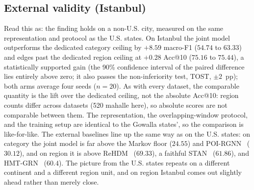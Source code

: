 \subsection{External validity (Istanbul)}
\label{sec:results-external}
Read this as: the finding holds on a non-U.S. city, measured on the same
representation and protocol as the U.S. states. On Istanbul the
joint model outperforms the dedicated category ceiling by $+8.59$ macro-F1
($54.74$ to $63.33$) and edges past the dedicated region ceiling at $+0.28$
Acc@10 ($75.16$ to $75.44$), a statistically supported gain (the 90\%
confidence interval of the paired difference lies entirely above zero; it also
passes the non-inferiority test, TOST, $\pm2$~pp); both arms average four seeds
($n{=}20$). As with every dataset, the comparable quantity is the lift over the dedicated
ceiling, not the absolute Acc@10: region counts differ across datasets (520
mahalle here), so absolute scores are not comparable between them. The representation, the overlapping-window protocol, and the training setup
are identical to the Gowalla states', so the comparison is like-for-like. The external baselines line up the same way as on
the U.S. states: on category the joint model is far above the Markov
floor ($24.55$) and POI-RGNN~\cite{capanema2023poirgnn} ($30.12$), and on
region it is above ReHDM~\cite{li2025rehdm} ($69.33$), a faithful
STAN~\cite{luo2021stan} ($61.86$), and HMT-GRN~\cite{lim2022hmtgrn} ($60.4$).
The picture from the U.S. states repeats on a different continent and a
different region unit, and on region Istanbul comes out slightly ahead rather
than merely close.
